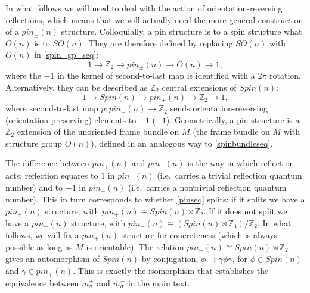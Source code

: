 \documentclass[12pt,a4paper]{article}
\newcounter{arrow}
\newcommand{\ra}{\rightarrow}
\newcommand{\zz}{\mathbb{Z}}
\newcommand{\zt}{\mathbb{Z}_2}
\newcommand\be            {\begin{equation}}
\newcommand\ee            {\end{equation}}
\newcommand{\ethan}[1]{{\color{amethyst}\footnotesize{(EL) #1}}}
\begin{document}
In what follows we will need to deal with the action of orientation-reversing reflections, which means that we will actually need the more general construction of a $pin_\pm(n)$ structure. Colloquially, a pin structure is to a spin structure what $O(n)$ is to $SO(n)$. They are therefore defined by replacing $SO(n)$ with $O(n)$ in \eqref{spin_gp_seq}:
\be \label{pin_gp_seq} 1 \ra \zt \ra pin_\pm(n) \ra O(n) \ra 1,\ee
where the $-1$ in the kernel of second-to-last map is identified with a $2\pi$ rotation.
Alternatively, they can be described as $\zt$ central extensions of $Spin(n)$:
\be \label{pinseq} 1\ra Spin(n) \ra pin_\pm(n) \ra \zt \ra 1,\ee 
where second-to-last map $p : pin_\pm(n) \ra \zt$ sends orientation-reversing (orientation-preserving) elements to $-1$ ($+1$). Geometrically, a pin structure is a $\zt$ extension of the unoriented frame bundle on $M$ (the frame bundle on $M$ with structure group $O(n)$), defined in an analogous way to \eqref{spinbundleseq}.

The difference between $pin_+(n)$ and $pin_-(n)$ is the way in which reflection acts: 
reflection squares to $1$ in $pin_+(n)$ (i.e.\ carries a trivial reflection quantum number) 
and to $-1$ in $pin_-(n)$ (i.e.\ carries a nontrivial reflection quantum number). 
This in turn corresponds to whether \eqref{pinseq} splits: if it splits we have a $pin_+(n)$ structure, 
with $pin_+(n) \cong Spin(n) \rtimes \zt$. If it does not split we have a $pin_-(n)$ structure, 
with $pin_-(n) \cong (Spin(n) \rtimes \zz_4)/\zt$. In what follows, we will fix a $pin_+(n)$ 
structure for concreteness (which is always possible as long as $M$ is orientable). 
The relation $pin_+(n) \cong Spin(n) \rtimes \zt$ gives an automorphism of $Spin(n)$ by 
conjugation, $\phi \mapsto \gamma \phi \gamma$, for $\phi \in Spin(n)$ and $\gamma \in pin_+(n)$. 
This is exactly the isomorphism that establishes the equivalence between $m_\sigma^+$ 
and $m_\sigma^-$ in the main text. 

\end{document}
